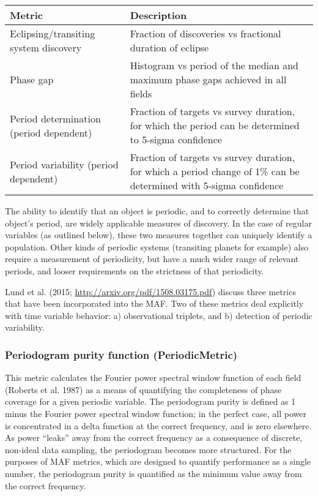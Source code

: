 
\begin{center}
\begin{tabular}{| p{5cm} |p{10cm} |}
\hline Metric & Description\\
\hline
Eclipsing/transiting system discovery & Fraction of discoveries vs fractional duration of eclipse\\
Phase gap & Histogram vs period of the median and maximum phase gaps achieved in all fields\\
Period determination (period dependent) & Fraction of targets vs survey duration, for which the period can be determined to 5-sigma confidence\\
Period variability (period dependent) & Fraction of targets vs survey duration, for which a period change of 1\% can be determined with 5-sigma confidence\\
  \hline \end{tabular}
 \end{center}

The ability to identify that an object is periodic, and to correctly determine that object's period, are widely applicable measures of discovery. In the case of regular variables (as outlined below), these two measures together can uniquely identify a population. Other kinds of periodic systems (transiting planets for example) also require a measurement of periodicity, but have a much wider range of relevant periods, and looser requirements on the strictness of that periodicity. 

Lund et al. (2015; \url{http://arxiv.org/pdf/1508.03175.pdf}) discuss three metrics that have been incorporated into the MAF. Two of these metrics deal explicitly with time variable behavior: a) observational triplets, and b) detection of periodic variability. 

\subsubsection{Periodogram purity function (PeriodicMetric)}
This metric calculates the Fourier power spectral window function of each field (Roberts et al. 1987) as a means of quantifying the completeness of phase coverage for a given periodic variable. The periodogram purity is defined as 1 minus the Fourier power spectral window function; in the perfect case, all power is concentrated in a delta function at the correct frequency, and is zero elsewhere. As power ``leaks'' away from the correct frequency as a consequence of discrete, non-ideal data sampling, the periodogram becomes more structured. For the purposes of MAF metrics, which are designed to quantify performance as a single number, the periodogram purity is quantified as the minimum value away from the correct frequency. 

